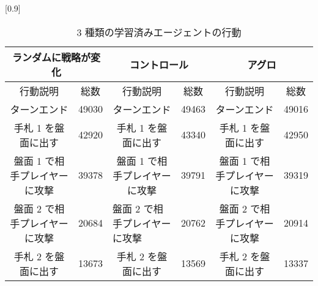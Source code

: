 \documentclass{jarticle}     %
\begin{document}
    \begin{table}[ht]
      \centering
      \caption{3 種類の学習済みエージェントの行動}
      \label{action}
      \scalebox{0.9}[0.9]{
        \begin{tabular}{|cc|cc|cc|}
          \hline
          \multicolumn{2}{|c|}{ランダムに戦略が変化}                & \multicolumn{2}{c|}{コントロール}                    & \multicolumn{2}{c|}{アグロ}                       \\ \hline
          \multicolumn{1}{|c|}{行動説明}             & 総数     & \multicolumn{1}{c|}{行動説明}             & 総数     & \multicolumn{1}{c|}{行動説明}             & 総数     \\ \hline
          \multicolumn{1}{|c|}{ターンエンド}           & 49030 & \multicolumn{1}{c|}{ターンエンド}           & 49463 & \multicolumn{1}{c|}{ターンエンド}           & 49016 \\ \hline
          \multicolumn{1}{|c|}{手札 1 を盤面に出す}      & 42920 & \multicolumn{1}{c|}{手札 1 を盤面に出す}      & 43340 & \multicolumn{1}{c|}{手札 1 を盤面に出す}      & 42950 \\ \hline
          \multicolumn{1}{|c|}{盤面 1 で相手プレイヤーに攻撃} & 39378 & \multicolumn{1}{c|}{盤面 1 で相手プレイヤーに攻撃} & 39791 & \multicolumn{1}{c|}{盤面 1 で相手プレイヤーに攻撃} & 39319 \\ \hline
          \multicolumn{1}{|c|}{盤面 2 で相手プレイヤーに攻撃} & 20684 & \multicolumn{1}{l|}{盤面 2 で相手プレイヤーに攻撃} & 20762 & \multicolumn{1}{c|}{盤面 2 で相手プレイヤーに攻撃} & 20914 \\ \hline
          \multicolumn{1}{|c|}{手札 2 を盤面に出す}      & 13673  & \multicolumn{1}{c|}{手札 2 を盤面に出す}      & 13569  & \multicolumn{1}{c|}{手札 2 を盤面に出す}      & 13337  \\ \hline
          \end{tabular}
      }
        \end{table}
\end{document}
